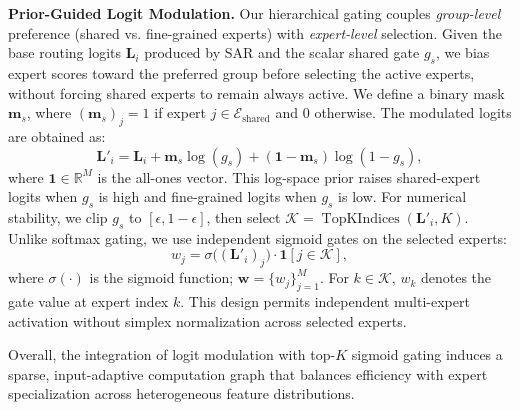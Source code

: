 
\noindent\textbf{Prior-Guided Logit Modulation.}
Our hierarchical gating couples \emph{group-level} preference (shared vs. fine-grained experts) with \emph{expert-level} selection. Given the base routing logits $\mathbf{L}_i$ produced by SAR and the scalar shared gate $g_s$, we bias expert scores toward the preferred group before selecting the active experts, without forcing shared experts to remain always active. We define a binary mask $\mathbf{m}_s$, where $(\mathbf{m}_s)_j = 1$ if expert $j \in \mathcal{E}_{\text{shared}}$ and $0$ otherwise. The modulated logits are obtained as:
\begin{equation}
    \mathbf{L}'_i = \mathbf{L}_i + \mathbf{m}_s \log(g_s) + (\mathbf{1} - \mathbf{m}_s) \log(1 - g_s),
    \label{eq:logit_modulation}
\end{equation}
where $\mathbf{1} \in \mathbb{R}^M$ is the all-ones vector. This log-space prior raises shared-expert logits when $g_s$ is high and fine-grained logits when $g_s$ is low. For numerical stability, we clip $g_s$ to $[\epsilon, 1-\epsilon]$, then select $\mathcal{K}=\operatorname{TopKIndices}(\mathbf{L}'_i,K)$. Unlike softmax gating, we use independent sigmoid gates on the selected experts:
\begin{equation}
    w_j = \sigma\big((\mathbf{L}'_i)_j\big) \cdot \mathbf{1}[j \in \mathcal{K}],
    \label{eq:topk_sigmoid}
\end{equation}
where $\sigma(\cdot)$ is the sigmoid function; $\mathbf{w} = \{w_j\}_{j=1}^{M}$. For $k \in \mathcal{K}$, $w_k$ denotes the gate value at expert index $k$. This design permits independent multi-expert activation without simplex normalization across selected experts.


Overall, the integration of logit modulation with top-$K$ sigmoid gating induces a sparse, input-adaptive computation graph that balances efficiency with expert specialization across heterogeneous feature distributions.

